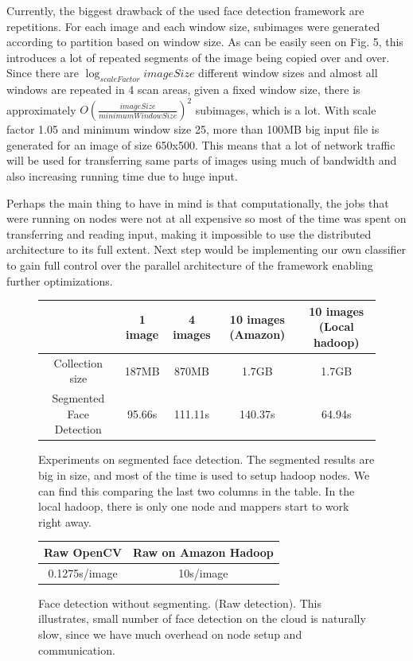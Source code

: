 \documentclass[11pt, draftclsnofoot, onecolumn]{IEEEtran}
\begin{document}
Currently, the biggest drawback of the used face detection framework are repetitions. For each image and each window size, subimages were generated according to partition based on window size. As can be easily seen on Fig. 5, this introduces a lot of repeated segments of the image being copied over and over. Since there are $\log_{scaleFactor}{imageSize}$ different window sizes and almost all windows are repeated in 4 scan areas, given a fixed window size, there is approximately $O(\frac{imageSize}{minimumWindowSize})^{2} $ subimages, which is a lot. With scale factor 1.05 and minimum window size 25, more than 100MB big input file is generated for an image of size 650x500. This means that a lot of network traffic will be used for transferring same parts of images using much of bandwidth and also increasing running time due to huge input.

Perhaps the main thing to have in mind is that computationally, the jobs that were running on nodes were not at all expensive so most of the time was spent on transferring and reading input, making it impossible to use the distributed architecture to its full extent. Next step would be implementing our own classifier to gain full control over the parallel architecture of the framework enabling further optimizations.
\begin{figure} \label{tab:seg_face_detect}

  \begin{tabular}{|c|c|c|c|c|}
  \hline
  & 1 image & 4 images & 10 images (Amazon) & 10 images (Local hadoop) \\ \hline
  Collection size & 187MB & 870MB & 1.7GB & 1.7GB\\ \hline
  Segmented Face Detection & 95.66s & 111.11s & 140.37s & 64.94s \\
  \hline  
  \end{tabular}
  
  \caption{Experiments on segmented face detection. The segmented results are big in size, and most of the time is used to setup hadoop nodes. We can find this comparing the last two columns in the table. In the local hadoop, there is only one node and mappers start to work right away.}
\end{figure}

\begin{figure} \label{tab:raw_face}
 \centering
 \begin{tabular} {|c|c|}
  \hline
  Raw OpenCV & Raw on Amazon Hadoop\\ \hline
  0.1275s/image & 10s/image \\ \hline
 \end{tabular}
 
 \caption{Face detection without segmenting. (Raw detection). This illustrates, small number of face detection on the cloud is naturally slow, since we have much overhead on node setup and communication.}
\end{figure}
\end{document}
